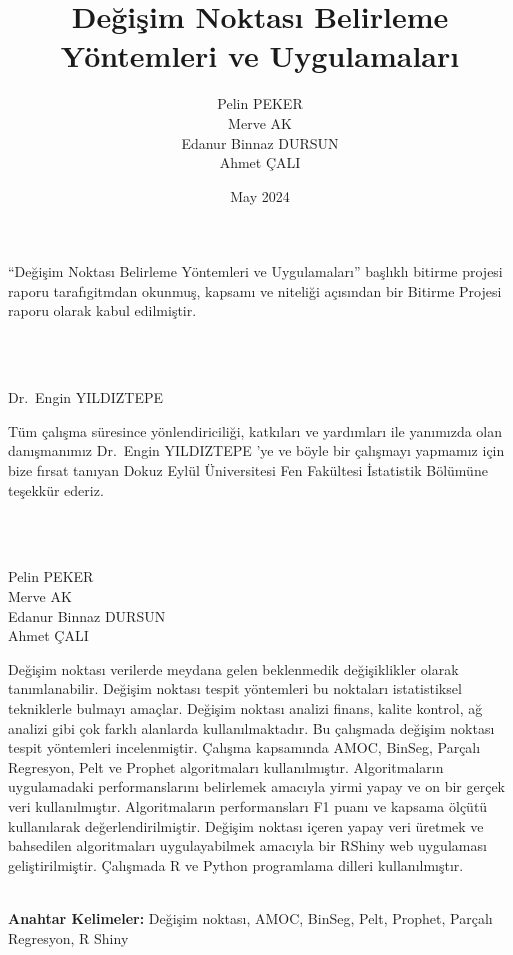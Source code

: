 \documentclass[12pt,twoside]{deuthesis}
\title{Değişim Noktası Belirleme Yöntemleri ve Uygulamaları}
\author{Pelin PEKER \\ Merve AK \\ Edanur Binnaz DURSUN \\ Ahmet ÇALI} %
\date{May 2024}
\begin{document}
  \maketitle

\frontmatter %
\pagestyle{empty} %

\begin{preface}
	``Değişim Noktası Belirleme Yöntemleri ve Uygulamaları'' başlıklı bitirme projesi raporu tarafıgitmdan okunmuş, kapsamı ve niteliği açısından bir Bitirme Projesi raporu olarak kabul edilmiştir.\\
\strut \\
\strut \\
Dr.~Engin YILDIZTEPE
\end{preface}

  \begin{acknowledgements}
    Tüm çalışma süresince yönlendiriciliği, katkıları ve yardımları ile yanımızda olan danışmanımız Dr.~Engin YILDIZTEPE 'ye ve böyle bir çalışmayı yapmamız için bize fırsat tanıyan Dokuz Eylül Üniversitesi Fen Fakültesi İstatistik Bölümüne teşekkür ederiz.\\
    \strut \\
    \strut \\
    Pelin PEKER\\
    Merve AK\\
    Edanur Binnaz DURSUN\\
    Ahmet ÇALI\\
  \end{acknowledgements}

\begin{abstractTR}
	Değişim noktası verilerde meydana gelen beklenmedik değişiklikler olarak tanımlanabilir. Değişim noktası tespit yöntemleri bu noktaları istatistiksel tekniklerle bulmayı amaçlar. Değişim noktası analizi finans, kalite kontrol, ağ analizi gibi çok farklı alanlarda kullanılmaktadır. Bu çalışmada değişim noktası tespit yöntemleri incelenmiştir. Çalışma kapsamında AMOC, BinSeg, Parçalı Regresyon, Pelt ve Prophet algoritmaları kullanılmıştır. Algoritmaların uygulamadaki performanslarını belirlemek amacıyla yirmi yapay ve on bir gerçek veri kullanılmıştır. Algoritmaların performansları F1 puanı ve kapsama ölçütü kullanılarak değerlendirilmiştir. Değişim noktası içeren yapay veri üretmek ve bahsedilen algoritmaları uygulayabilmek amacıyla bir RShiny web uygulaması geliştirilmiştir. Çalışmada R ve Python programlama dilleri kullanılmıştır.\\
\strut \\

\textbf{Anahtar Kelimeler:} Değişim noktası, AMOC, BinSeg, Pelt, Prophet, Parçalı Regresyon, R Shiny
\end{abstractTR}
\end{document}
